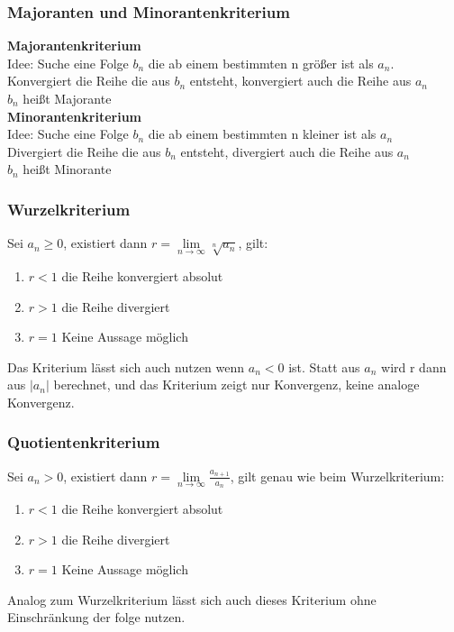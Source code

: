 \documentclass[12pt,a4paper]{article}
\begin{document}
\subsubsection{Majoranten und Minorantenkriterium}
\textbf{Majorantenkriterium}\\
Idee: Suche eine Folge $b_n$ die ab einem bestimmten n größer ist als $a_n$.\\
Konvergiert die Reihe die aus $b_n$ entsteht, konvergiert auch die Reihe aus $a_n$\\
$b_n$ heißt Majorante\\
\textbf{Minorantenkriterium}\\
Idee: Suche eine Folge $b_n$ die ab einem bestimmten n kleiner ist als $a_n$\\
Divergiert die Reihe die aus $b_n$ entsteht, divergiert auch die Reihe aus $a_n$\\
$b_n$ heißt Minorante\\

\subsubsection{Wurzelkriterium}
Sei $a_n\geq 0$, existiert dann $r = \lim\limits_{n\rightarrow\infty} \sqrt[n]{a_n}$, gilt:
\begin{enumerate}
	\item $r<1$		die Reihe konvergiert absolut
	\item $r>1$		die Reihe divergiert
	\item $r=1$		Keine Aussage möglich
\end{enumerate}
Das Kriterium lässt sich auch nutzen wenn $a_n<0$ ist. Statt aus $a_n$ wird r dann aus $|a_n|$ berechnet, und das Kriterium zeigt nur Konvergenz, keine analoge Konvergenz.

\subsubsection{Quotientenkriterium}
Sei $a_n> 0$, existiert dann $r = \lim\limits_{n\rightarrow\infty} \frac{a_{n+1}}{a_n}$, gilt genau wie beim Wurzelkriterium:
\begin{enumerate}
	\item $r<1$		die Reihe konvergiert absolut
	\item $r>1$		die Reihe divergiert
	\item $r=1$		Keine Aussage möglich
\end{enumerate}
Analog zum Wurzelkriterium lässt sich auch dieses Kriterium ohne Einschränkung der folge nutzen.
\end{document}
